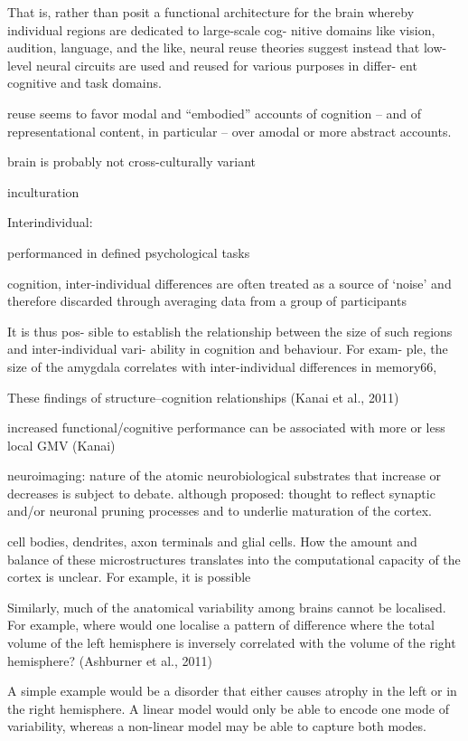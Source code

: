 \documentclass[authoryear,review,3p]{elsarticle}
\begin{document}
That is, rather than posit a functional architecture for the brain whereby individual regions are dedicated to large-scale cog- nitive domains like vision, audition, language, and the like, neural reuse theories suggest instead that low-level neural circuits are used and reused for various purposes in differ- ent cognitive and task domains.

reuse seems to favor modal and “embodied” accounts of cognition – and of representational content, in particular – over amodal or more abstract accounts. 

brain is probably not cross-culturally variant

inculturation





Interindividual:

performanced in defined psychological tasks

cognition, inter-individual differences
are often treated as a source of ‘noise’ and therefore discarded through averaging data from a group of participants

It is thus pos- sible to establish the relationship between the size of such regions and inter-individual vari- ability in cognition and behaviour. For exam- ple, the size of the amygdala correlates with inter-individual differences in memory66,

These findings of structure–cognition relationships (Kanai et al., 2011)

increased functional/cognitive performance
can be associated with more or less local GMV (Kanai)

neuroimaging: nature of the atomic neurobiological substrates
that increase or decreases is subject to debate.
although proposed: thought to reflect synaptic and/or neuronal
pruning processes and to underlie maturation of the cortex.

cell bodies, dendrites, axon terminals and glial cells.
How the amount and balance of these microstructures
translates into the computational capacity of the cortex is unclear. For example, it is possible

Similarly, much of the anatomical variability among brains cannot be localised. For example, where would one localise a pattern of difference where the total volume of the left hemisphere is inversely correlated with the volume of the right hemisphere?
(Ashburner et al., 2011)

A simple example would be a disorder that either causes atrophy in the left or in the right hemisphere. A linear model would only be able to encode one mode of variability, whereas a non-linear model may be able to capture both modes.
\end{document}
